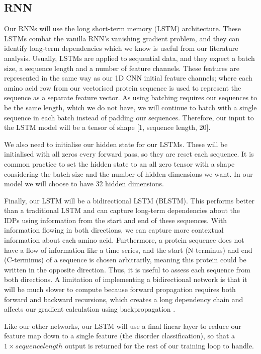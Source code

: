 \documentclass{l4proj}
\begin{document}
\subsection{RNN}
\label{chap:design section:rnn}

Our RNNs will use the long short-term memory (LSTM) architecture. These LSTMs combat the vanilla RNN’s vanishing gradient problem, and they can identify long-term dependencies which we know is useful from our literature analysis. Usually, LSTMs are applied to sequential data, and they expect a batch size, a sequence length and a number of feature channels. These features are represented in the same way as our 1D CNN initial feature channels; where each amino acid row from our vectorised protein sequence is used to represent the sequence as a separate feature vector. As using batching requires our sequences to be the same length, which we do not have, we will continue to batch with a single sequence in each batch instead of padding our sequences. Therefore, our input to the LSTM model will be a tensor of shape [1, sequence length, 20]. 

We also need to initialise our hidden state for our LSTMs. These will be initialised with all zeros every forward pass, so they are reset each sequence. It is common practice to set the hidden state to an all zero tensor with a shape considering the batch size and the number of hidden dimensions we want. In our model we will choose to have 32 hidden dimensions. 

Finally, our LSTM will be a bidirectional LSTM (BLSTM). This performs better than a traditional LSTM and can capture long-term dependencies about the IDPs using information from the start and end of these sequences. With information flowing in both directions, we can capture more contextual information about each amino acid. Furthermore, a protein sequence does not have a flow of information like a time series, and the start (N-terminus) and end (C-terminus) of a sequence is chosen arbitrarily, meaning this protein could be written in the opposite direction. Thus, it is useful to assess each sequence from both directions. A limitation of implementing a bidirectional network is that it will be much slower to compute because forward propagation requires both forward and backward recursions, which creates a long dependency chain and affects our gradient calculation using backpropagation \citep{Zhang:2021}.  

Like our other networks, our LSTM will use a final linear layer to reduce our feature map down to a single feature (the disorder classification), so that a $1\times sequence length$ output is returned for the rest of our training loop to handle.
\end{document}
